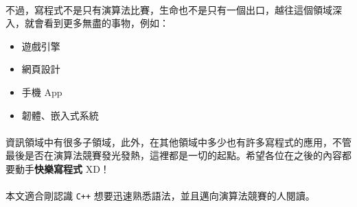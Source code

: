 \documentclass[12pt,a4paper,oneside]{report}
\begin{document}
\begin{CJK}{UTF8}{bkai}
\paragraph{}不過，寫程式不是只有演算法比賽，生命也不是只有一個出口，越往這個領域深入，就會看到更多無盡的事物，例如：
\begin{itemize}
\item 遊戲引擎
\item 網頁設計
\item 手機 App
\item 韌體、嵌入式系統
\end{itemize}

\paragraph{}資訊領域中有很多子領域，此外，在其他領域中多少也有許多寫程式的應用，不管最後是否在演算法競賽發光發熱，這裡都是一切的起點。希望各位在之後的內容都要動手\textbf{快樂寫程式} XD！

\paragraph{}本文適合剛認識 \texttt{C++} 想要迅速熟悉語法，並且邁向演算法競賽的人閱讀。

\ifx \allfiles \undefined

\printindex

\clearpage
\end{CJK}
\end{document}
